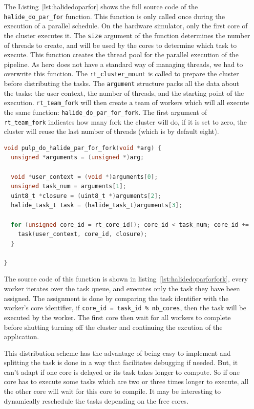     The Listing~\ref{lst:halidedoparfor} shows the full source code of the \texttt{halide\_do\_par\_for} function.
    This function is only called once during the execution of a parallel schedule. On the hardware simulator, only the first core of the cluster executes it.
    The \texttt{size} argument of the function determines the number of threads to create, and will be used by the cores to determine which task to execute. 
    This function creates the thread pool for the parallel execution of the pipeline. As \gls{hero} does not have a standard way of managing threads, we had to overwrite this function.
    The \texttt{rt\_cluster\_mount} is called to prepare the cluster before distributing the tasks.
    The \texttt{argument} structure packs all the data about the tasks: the user context,  the number of threads, and the starting point of the execution.
    \texttt{rt\_team\_fork} will then create a team of workers which will all execute the same function: \texttt{halide\_do\_par\_for\_fork}.
    The first argument of \texttt{rt\_team\_fork} indicates how many fork the cluster will do, if it is set to zero, the cluster will reuse the last number of threads (which is by default eight).



\begin{lstlisting}[language=C,caption={The \texttt{halide\_do\_par\_for\_fork} function.},label={lst:halidedoparforfork},captionpos=b]
void pulp_do_halide_par_for_fork(void *arg) {
  unsigned *arguments = (unsigned *)arg;

  void *user_context = (void *)arguments[0];
  unsigned task_num = arguments[1];
  uint8_t *closure = (uint8_t *)arguments[2];
  halide_task_t task = (halide_task_t)arguments[3];

  for (unsigned core_id = rt_core_id(); core_id < task_num; core_id += (int)&__rt_nb_pe) {
    task(user_context, core_id, closure);
  }

}
\end{lstlisting}
    The source code of this function is shown in listing~\ref{lst:halidedoparforfork}, every worker iterates over the task queue, and executes only the task they have been assigned.
    The assignment is done by comparing the task identifier with the worker's core identifier, if \texttt{core\_id = task\_id \% nb\_cores}, then the task will be executed by the worker. 
	The first core then wait for all workers to complete before shutting turning off the cluster and continuing the excution of the application.


    
    This distribution scheme has the advantage of being easy to implement and splitting the task is done in a way that facilitates debugging if needed.
    But, it can't adapt if one core is delayed or its task takes longer to compute.
So if one core has to execute some tasks which are two or three times longer to execute, all the other core will wait for this core to compile.
    It may be interesting to dynamically reschedule the tasks depending on the free cores.

